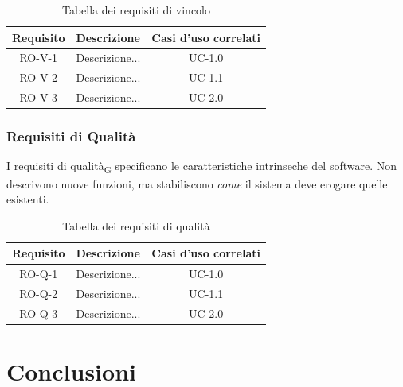 \documentclass[11pt,a4paper]{article}
\begin{document}
\begin{table}[H]
    \centering
    \begin{tabular}{|c|>{\raggedright\arraybackslash}p{}|c|}
        \hline
        \textbf{Requisito} & \textbf{Descrizione} & \textbf{Casi d'uso correlati}\\
        \hline
        RO-V-1 & Descrizione... & UC-1.0 \\
        \hline
        RO-V-2 & Descrizione... & UC-1.1 \\
        \hline
        RO-V-3 &Descrizione... & UC-2.0 \\
        \hline
    \end{tabular}
    \caption{Tabella dei requisiti di vincolo}
\end{table}


\subsubsection{Requisiti di Qualità}
I requisiti di qualità\textsubscript{G} specificano le caratteristiche intrinseche del software. Non descrivono nuove funzioni, ma stabiliscono \textit{come} il sistema deve erogare quelle esistenti. 


\begin{table}[H]
    \centering
    \begin{tabular}{|c|>{\raggedright\arraybackslash}p{}|c|}
        \hline
        \textbf{Requisito} & \textbf{Descrizione} & \textbf{Casi d'uso correlati}\\
        \hline
        RO-Q-1 & Descrizione... & UC-1.0 \\
        \hline
        RO-Q-2 & Descrizione... & UC-1.1 \\
        \hline
        RO-Q-3 &Descrizione... & UC-2.0 \\
        \hline
    \end{tabular}
    \caption{Tabella dei requisiti di qualità}
\end{table}

\newpage

\section{Conclusioni}
\end{document}
